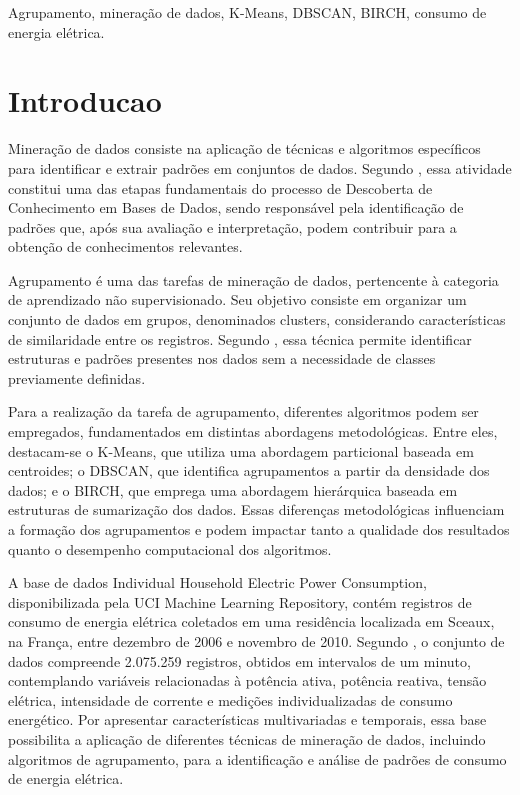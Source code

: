 \documentclass[lettersize,journal]{IEEEtran}
\begin{document}
\begin{IEEEkeywords}

Agrupamento, mineração de dados, K-Means, DBSCAN, BIRCH, consumo de energia elétrica.

\end{IEEEkeywords}


\section{Introducao}
Mineração de dados consiste na aplicação de técnicas e algoritmos específicos para identificar e extrair padrões em conjuntos de dados. Segundo \cite{Fayyad1996}, essa atividade constitui uma das etapas fundamentais do processo de Descoberta de Conhecimento em Bases de Dados, sendo responsável pela identificação de padrões que, após sua avaliação e interpretação, podem contribuir para a obtenção de conhecimentos relevantes.

Agrupamento é uma das tarefas de mineração de dados, pertencente à categoria de aprendizado não supervisionado. Seu objetivo consiste em organizar um conjunto de dados em grupos, denominados clusters, considerando características de similaridade entre os registros. Segundo \cite{Jain1999}, essa técnica permite identificar estruturas e padrões presentes nos dados sem a necessidade de classes previamente definidas.

Para a realização da tarefa de agrupamento, diferentes algoritmos podem ser empregados, fundamentados em distintas abordagens metodológicas. Entre eles, destacam-se o K-Means, que utiliza uma abordagem particional baseada em centroides; o DBSCAN, que identifica agrupamentos a partir da densidade dos dados; e o BIRCH, que emprega uma abordagem hierárquica baseada em estruturas de sumarização dos dados. Essas diferenças metodológicas influenciam a formação dos agrupamentos e podem impactar tanto a qualidade dos resultados quanto o desempenho computacional dos algoritmos.

A base de dados Individual Household Electric Power Consumption, disponibilizada pela UCI Machine Learning Repository, contém registros de consumo de energia elétrica coletados em uma residência localizada em Sceaux, na França, entre dezembro de 2006 e novembro de 2010. Segundo \cite{Hebrail2006}, o conjunto de dados compreende 2.075.259 registros, obtidos em intervalos de um minuto, contemplando variáveis relacionadas à potência ativa, potência reativa, tensão elétrica, intensidade de corrente e medições individualizadas de consumo energético. Por apresentar características multivariadas e temporais, essa base possibilita a aplicação de diferentes técnicas de mineração de dados, incluindo algoritmos de agrupamento, para a identificação e análise de padrões de consumo de energia elétrica. 
\end{document}
